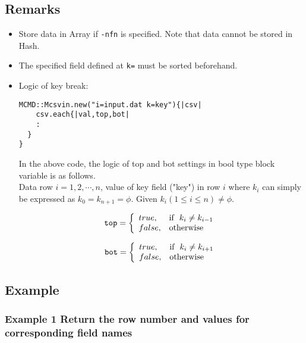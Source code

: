 \subsection{Remarks}
\begin{itemize}
\item Store data in Array if \verb|-nfn| is specified. Note that data cannot be stored in Hash.
\item The specified field defined at \verb|k=| must be sorted beforehand. 
\item Logic of key break:
\begin{verbatim}
MCMD::Mcsvin.new("i=input.dat k=key"){|csv|
	csv.each{|val,top,bot|
    :
  }
}
\end{verbatim}
In the above code, the logic of top and bot settings in bool type block variable is as follows.  \\
Data row $i=1,2,\cdots,n$, value of key field ("key") in row $i$ where $k_i$ can simply be expressed as $k_0=k_{n+1}=\phi$. Given $k_i(1\le i \le n) \ne \phi$. 

\begin{eqnarray}
\verb/top/=\left\{
\begin{array}{ll}
true,  & {\rm if}\hspace{2mm} k_i \ne k_{i-1} \\
false, & {\rm otherwise}\\
\end{array} \right.
\label{eq:retDisc}
\end{eqnarray}

\begin{eqnarray}
\verb/bot/=\left\{
\begin{array}{ll}
true,  & {\rm if}\hspace{2mm} k_i \ne k_{i+1} \\
false, & {\rm otherwise}\\
\end{array} \right.
\label{eq:retDisc}
\end{eqnarray}

\end{itemize}

\subsection{Example}
\subsubsection*{Example 1 Return the row number and values for corresponding field names}

